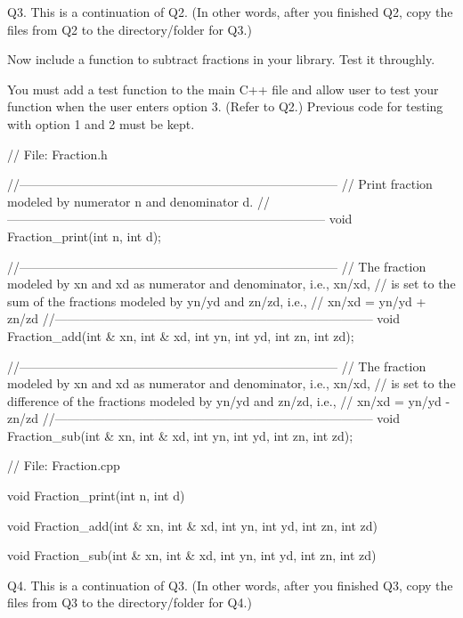 \newpage
Q3. This is a continuation of Q2.
(In other words, after you finished Q2, copy the files from Q2
to the directory/folder for Q3.)

Now include a function to subtract fractions in your library.
Test it throughly.

You must add a test function to the main C++ file and allow user to test
your function when the user enters option 3. (Refer to Q2.)
Previous code for testing with option 1 and 2 must be kept.

{\small
\begin{console}
// File: Fraction.h

//-----------------------------------------------------------------------------
// Print fraction modeled by numerator n and denominator d.
//-----------------------------------------------------------------------------
void Fraction_print(int n, int d);

//-----------------------------------------------------------------------------
// The fraction modeled by xn and xd as numerator and denominator, i.e., xn/xd,
// is set to the sum of the fractions modeled by yn/yd and zn/zd, i.e.,
// xn/xd = yn/yd + zn/zd 
//-----------------------------------------------------------------------------
void Fraction_add(int & xn, int & xd,
                  int yn, int yd,
                  int zn, int zd);

//-----------------------------------------------------------------------------
// The fraction modeled by xn and xd as numerator and denominator, i.e., xn/xd,
// is set to the difference of the fractions modeled by yn/yd and zn/zd, i.e.,
// xn/xd = yn/yd - zn/zd 
//-----------------------------------------------------------------------------
void Fraction_sub(int & xn, int & xd,
                  int yn, int yd,
                  int zn, int zd);

\end{console}
\begin{console}
// File: Fraction.cpp

void Fraction_print(int n, int d)
{
}


void Fraction_add(int & xn, int & xd,
                  int yn, int yd,
                  int zn, int zd)
{
}


void Fraction_sub(int & xn, int & xd,
                  int yn, int yd,
                  int zn, int zd)
{
}
\end{console}
}


\newpage
Q4. This is a continuation of Q3.
(In other words, after you finished Q3, copy the files from Q3
to the directory/folder for Q4.)

